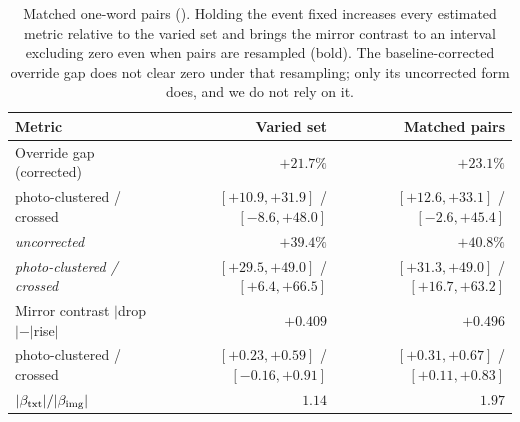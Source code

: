 \begin{table}[htbp]
  \caption{Matched one-word pairs (\qwen{}). Holding the event fixed increases every estimated metric relative to the varied set and brings the mirror contrast to an interval excluding zero even when pairs are resampled (bold). The baseline-corrected override gap does not clear zero under that resampling; only its uncorrected form does, and we do not rely on it.}
  \label{tab:minimal}
  \centering
  \small
  \begin{tabular}{lrr}
    \toprule
    Metric & Varied set & Matched pairs \\
    \midrule
    Override gap (corrected) & $+21.7\%$ & $+23.1\%$ \\
    \quad photo-clustered / crossed & $[+10.9,+31.9]$ / $[-8.6,+48.0]$ & $[+12.6,+33.1]$ / $[-2.6,+45.4]$ \\
    \addlinespace[1pt]
    \quad \emph{uncorrected} & $+39.4\%$ & $+40.8\%$ \\
    \quad \emph{photo-clustered / crossed} & $[+29.5,+49.0]$ / $[+6.4,+66.5]$ & $[+31.3,+49.0]$ / $[+16.7,+63.2]$ \\
    Mirror contrast $|$drop$|-|$rise$|$ & $+0.409$ & $+0.496$ \\
    \quad photo-clustered / crossed & $[+0.23,+0.59]$ / $[-0.16,+0.91]$ & $[+0.31,+0.67]$ / $\mathbf{[+0.11,+0.83]}$ \\
    $|\beta_{\text{txt}}|/|\beta_{\text{img}}|$ & $1.14$ & $1.97$ \\
    \bottomrule
  \end{tabular}
\end{table}

